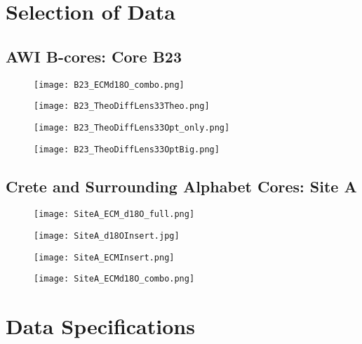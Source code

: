 \documentclass[../../CompleteThesis/Complete_1stDraft]{subfiles}
\begin{document}
\section[Selection][Selection]{Selection of Data}
\label{Sec:Data_Selection}
\subsection[AWI B-cores]{AWI B-cores: Core B23}
\label{Subsec:Data_Selection_Bcores}


\begin{figure}[h]
	\centering
	\texttt{[image: B23\_ECMd18O\_combo.png]}
	\caption[]{}
	\label{fig:B23_ECMd18O_combo}
\end{figure}

\begin{figure}[h]
	\centering
	\texttt{[image: B23\_TheoDiffLens33Theo.png]}
	\caption[]{}
	\label{fig:B23_BD_Theo}
\end{figure}

\begin{figure}[h]
	\centering
	\texttt{[image: B23\_TheoDiffLens33Opt\_only.png]}
	\caption[]{}
	\label{fig:B23_BD_OptOnly}
\end{figure}

\begin{figure}[h]
	\centering
	\texttt{[image: B23\_TheoDiffLens33OptBig.png]}
	\caption[]{}
	\label{fig:B23_BD_OptBig}
\end{figure}


\subsection[Crete Area][Crete Area]{Crete and Surrounding Alphabet Cores: Site A}
\label{Subsec:Data_Selection_Alhabet}

\begin{figure}[h]
	\centering
	\texttt{[image: SiteA\_ECM\_d18O\_full.png]}
	\caption[]{}
	\label{fig:SiteA__ECM_d18O_full.png}
\end{figure}

\begin{figure}[h]
	\centering
	\texttt{[image: SiteA\_d18OInsert.jpg]}
	\caption[]{}
	\label{fig:SiteA_d18OInsert}
\end{figure}

\begin{figure}[h]
	\centering
	\texttt{[image: SiteA\_ECMInsert.png]}
	\caption[]{}
	\label{fig:SiteA_ECMInsert}
\end{figure}

\begin{figure}[h]
	\centering
	\texttt{[image: SiteA\_ECMd18O\_combo.png]}
	\caption[]{}
	\label{fig:SiteA_ECMd18O_combo}
\end{figure}

\section[Data Specifications][Data Specifications]{Data Specifications}
\label{Sec:Data_Specifications}
\end{document}
